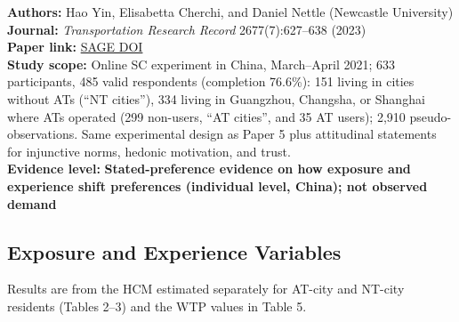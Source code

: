 \documentclass[10pt,a4paper]{article}
\begin{document}
\begin{mdframed}[linecolor=red!60,linewidth=2pt]
\textbf{Authors:} Hao Yin, Elisabetta Cherchi, and Daniel Nettle (Newcastle University)\\
\textbf{Journal:} \emph{Transportation Research Record} 2677(7):627--638 (2023)\\
\textbf{Paper link:} \href{https://doi.org/10.1177/03611981231155181}{SAGE DOI}\\
\textbf{Study scope:} Online SC experiment in China, March--April 2021; 633 participants, 485 valid respondents (completion 76.6\%): 151 living in cities without ATs (``NT cities''), 334 living in Guangzhou, Changsha, or Shanghai where ATs operated (299 non-users, ``AT cities'', and 35 AT users); 2,910 pseudo-observations. Same experimental design as Paper 5 plus attitudinal statements for injunctive norms, hedonic motivation, and trust.\\
\textbf{Evidence level:} \textbf{Stated-preference evidence on how exposure and experience shift preferences (individual level, China); not observed demand}

\hypertarget{exposure-and-experience-variables}{%
\subsection{Exposure and Experience Variables}\label{exposure-and-experience-variables}}

Results are from the HCM estimated separately for AT-city and NT-city residents (Tables 2--3) and the WTP values in Table 5.


\end{mdframed}
\end{document}
